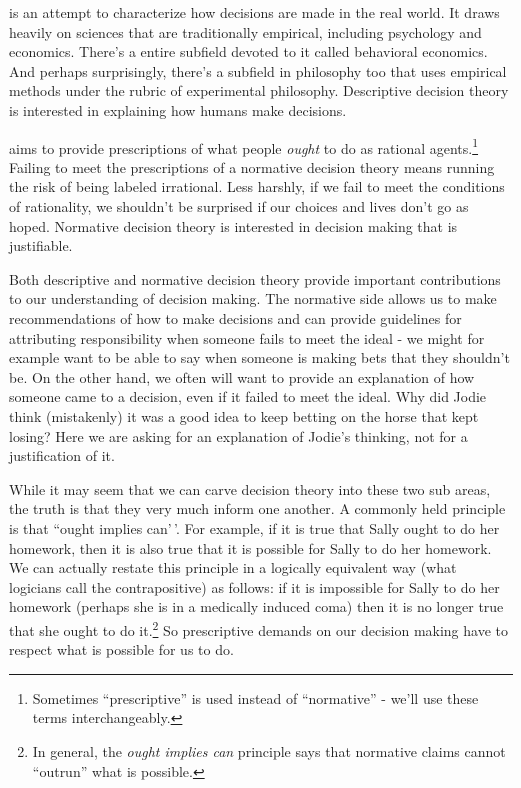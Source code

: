 \documentclass[]{tufte-book}
\begin{document}
 is an attempt to characterize how decisions are made in the real world. It draws heavily on sciences that are traditionally empirical, including psychology and economics. There's a entire subfield devoted to it called behavioral economics. And perhaps surprisingly, there's a subfield in philosophy too that uses empirical methods under the rubric of experimental philosophy. Descriptive decision theory is interested in explaining how humans make decisions.

 aims to provide prescriptions of what people \emph{ought} to do as rational agents.\footnote{Sometimes ``prescriptive'' is used instead of ``normative'' - we'll use these terms interchangeably.} Failing to meet the prescriptions of a normative decision theory means running the risk of being labeled irrational. Less harshly, if we fail to meet the conditions of rationality, we shouldn't be surprised if our choices and lives don't go as hoped. Normative decision theory is interested in decision making that is justifiable.

Both descriptive and normative decision theory provide important contributions to our understanding of decision making. The normative side allows us to make recommendations of how to make decisions and can provide guidelines for attributing responsibility when someone fails to meet the ideal - we might for example want to be able to say when someone is making bets that they shouldn't be. On the other hand, we often will want to provide an explanation of how someone came to a decision, even if it failed to meet the ideal. Why did Jodie think (mistakenly) it was a good idea to keep betting on the horse that kept losing? Here we are asking for an explanation of Jodie's thinking, not for a justification of it.

While it may seem that we can carve decision theory into these two sub areas, the truth is that they very much inform one another. A commonly held principle is that ``ought implies can'\,'. For example, if it is true that Sally ought to do her homework, then it is also true that it is possible for Sally to do her homework. We can actually restate this principle in a logically equivalent way (what logicians call the contrapositive) as follows: if it is impossible for Sally to do her homework (perhaps she is in a medically induced coma) then it is no longer true that she ought to do it.\footnote{In general, the \emph{ought implies can} principle says that normative claims cannot ``outrun'' what is possible.} So prescriptive demands on our decision making have to respect what is possible for us to do.
\end{document}
